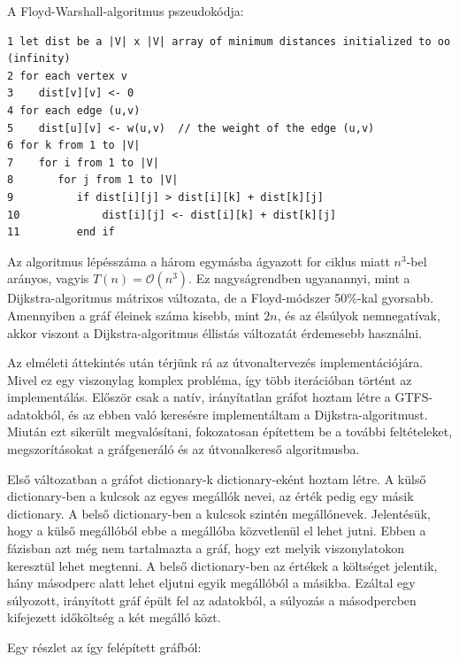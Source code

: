 A Floyd-Warshall-algoritmus pszeudokódja:


\begin{verbatim}
1 let dist be a |V| x |V| array of minimum distances initialized to oo (infinity)
2 for each vertex v
3    dist[v][v] <- 0
4 for each edge (u,v)
5    dist[u][v] <- w(u,v)  // the weight of the edge (u,v)
6 for k from 1 to |V|
7    for i from 1 to |V|
8       for j from 1 to |V|
9          if dist[i][j] > dist[i][k] + dist[k][j] 
10             dist[i][j] <- dist[i][k] + dist[k][j]
11         end if
\end{verbatim}

Az algoritmus lépésszáma a három egymásba ágyazott for ciklus miatt $n^3$-bel arányos, vagyis $T(n) = \mathcal{O}(n^3)$. Ez nagyságrendben ugyanannyi, mint a Dijkstra-algoritmus mátrixos változata, de a Floyd-módszer 50\%-kal gyorsabb. Amennyiben a gráf éleinek száma kisebb, mint $2n$, és az élsúlyok nemnegatívak, akkor viszont a Dijkstra-algoritmus éllistás változatát érdemesebb használni.


Az elméleti áttekintés után térjünk rá az útvonaltervezés implementációjára. Mivel ez egy viszonylag komplex probléma, így több iterációban történt az implementálás. Először csak a natív, irányítatlan gráfot hoztam létre a GTFS-adatokból, és az ebben való keresésre implementáltam a Dijkstra-algoritmust. Miután ezt sikerült megvalósítani, fokozatosan építettem be a további feltételeket, megszorításokat a gráfgeneráló és az útvonalkereső algoritmusba.

Első változatban a gráfot dictionary-k dic\-ti\-o\-na\-ry-eként hoztam létre. A külső dic\-ti\-o\-na\-ry-ben a kulcsok az egyes megállók nevei, az érték pedig egy másik dictionary. A belső dictionary-ben a kulcsok szintén megállónevek. Jelentésük, hogy a külső megállóból ebbe a megállóba közvetlenül el lehet jutni. Ebben a fázisban azt még nem tartalmazta a gráf, hogy ezt melyik viszonylatokon keresztül lehet megtenni. A belső dictionary-ben az értékek a költséget jelentik, hány másodperc alatt lehet eljutni egyik megállóból a másikba. Ezáltal egy súlyozott, irányított gráf épült fel az adatokból, a súlyozás a másodpercben kifejezett időköltség a két megálló közt.

Egy részlet az így felépített gráfból:

